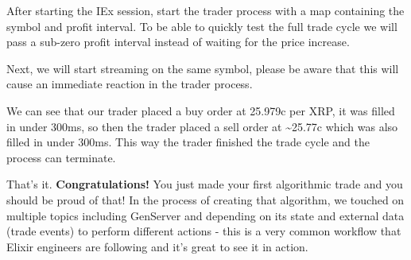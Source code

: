 \documentclass[
  oneside]{book}
\newenvironment{Shaded}{\begin{snugshade}}{\end{snugshade}}
\newcommand{\AttributeTok}[1]{\textcolor[rgb]{0.13,0.29,0.53}{#1}}
\newcommand{\CommentTok}[1]{\textcolor[rgb]{0.56,0.35,0.01}{\textit{#1}}}
\newcommand{\ErrorTok}[1]{\textcolor[rgb]{0.64,0.00,0.00}{\textbf{#1}}}
\newcommand{\ExtensionTok}[1]{#1}
\newcommand{\KeywordTok}[1]{\textcolor[rgb]{0.13,0.29,0.53}{\textbf{#1}}}
\newcommand{\NormalTok}[1]{#1}
\newcommand{\OperatorTok}[1]{\textcolor[rgb]{0.81,0.36,0.00}{\textbf{#1}}}
\newcommand{\PreprocessorTok}[1]{\textcolor[rgb]{0.56,0.35,0.01}{\textit{#1}}}
\newcommand{\SpecialStringTok}[1]{\textcolor[rgb]{0.31,0.60,0.02}{#1}}
\newcommand{\StringTok}[1]{\textcolor[rgb]{0.31,0.60,0.02}{#1}}
\begin{document}
\begin{Shaded}
\end{Shaded}

After starting the IEx session, start the trader process with a map containing the symbol and profit interval. To be able to quickly test the full trade cycle we will pass a sub-zero profit interval instead of waiting for the price increase.

Next, we will start streaming on the same symbol, please be aware that this will cause an immediate reaction in the trader process.

We can see that our trader placed a buy order at 25.979c per XRP, it was filled in under 300ms, so then the trader placed a sell order at \textasciitilde25.77c
which was also filled in under 300ms. This way the trader finished the trade
cycle and the process can terminate.

That's it. \textbf{Congratulations!} You just made your first algorithmic trade and you should be proud of that! In the process of creating that algorithm, we touched on multiple topics including GenServer and depending on its state and external data (trade events) to perform different actions - this is a very common workflow that Elixir engineers are following and it's great to see it in action.
\end{document}
